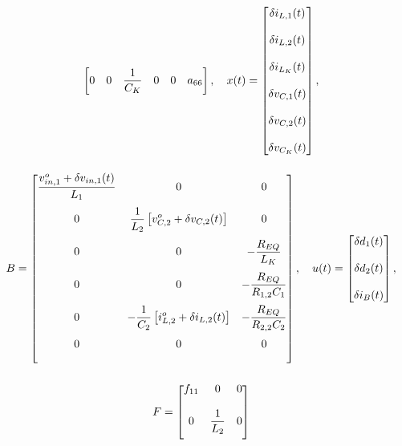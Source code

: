 \begin{gather}
\begin{bmatrix}
    0                         & 0                         & \displaystyle \frac{1}{C_K}                         & 0                                    & 0                                    & a_{66}
  \end{bmatrix}, \quad
  x(t) = \begin{bmatrix}
    \delta i_{L,1}(t) \\[12pt] \delta i_{L,2}(t) \\[12pt] \delta i_{L_K}(t) \\[12pt]
    \delta v_{C,1}(t) \\[12pt] \delta v_{C,2}(t) \\[12pt] \delta v_{C_K}(t)
  \end{bmatrix}, \notag \\[12pt]
  B = \begin{bmatrix}
    \displaystyle \frac{v_{in,1}^o + \delta v_{in,1}(t)}{L_1} & 0                 & 0                                                        \\[12pt]
    0                      & \displaystyle \frac{1}{L_2} \left[ v_{C,2}^o + \delta v_{C,2}(t) \right]     & 0                              
                                    \\[12pt]
    0                      & 0                 & - \displaystyle \frac{R_{EQ}}{L_K}                                     \\[12pt]
    0                      & 0                 & - \displaystyle \frac{R_{EQ}}{R_{1,2}C_1}                    \\[12pt]
    0                      & - \displaystyle \frac{1}{C_2} \left[ i_{L,2}^o + \delta i_{L,2}(t) \right]                 & - \displaystyle \frac{R_{EQ}}{R_{2,2}C_2}                                      \\[12pt]
    0                      & 0                 & 0 
                                    \\[12pt]
  \end{bmatrix}, \quad
  u(t) = \begin{bmatrix}
    \delta d_1(t) \\[12pt] \delta d_2(t) \\[12pt] \delta i_{B}(t)
  \end{bmatrix}, \notag \\[12pt]
  F = \begin{bmatrix}
      f_{11} & 0                   & 0
                            \\[12pt]
      0 & \displaystyle \frac{1}{L_2}   & 0 
                            \\[12pt]

\end{bmatrix}
\end{gather}
